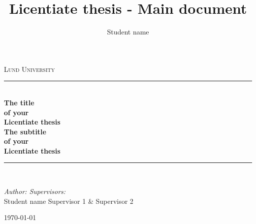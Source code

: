 \documentclass[12pt,twoside]{report}
\title{Licentiate thesis - Main document}
\author{Student name}
\newcommand{\HRule}{\rule{\linewidth}{0.5mm}}
\begin{document}
%

\begin{center}
\textsc{\LARGE Lund University}\\[1.5cm]
\HRule \\[0.8cm]{ \huge \bfseries The title\\
[0.4cm]of your\\
[0.4cm]Licentiate thesis}\\
[0.8cm]{ \huge \bfseries The subtitle \\
[0.15cm] of your \\
[0.27cm] Licentiate thesis}\\
[0.8cm]\HRule \\[0.4cm]
\vskip0.8cm

\begin{minipage}{0.8\textwidth}
\large
\emph{Author: \qquad \qquad \qquad \qquad \qquad  Supervisors:}\\
Student name \qquad \qquad \quad \quad Supervisor 1 \& Supervisor 2
\end{minipage}

\vfill
\large\today
\thispagestyle{empty}
\end{center}

\newpage
\thispagestyle{empty}
\mbox{} %





\newpage
\thispagestyle{empty}
\mbox{} %


\newpage
\setcounter{page}{1} %
\tableofcontents
















\begin{appendix}





\end{appendix}
\end{document}
